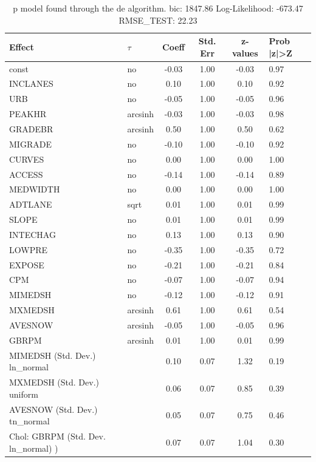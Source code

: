 \begin{table}
	\caption{p model found through the de algorithm. bic: 1847.86 Log-Likelihood: -673.47 RMSE_TEST: 22.23}
	\begin{center}
		\begin{tabular}{|l|l|c|c|c|l|}
			\hline
			Effect & $\tau$ & Coeff & Std. Err & z-values & Prob |z|>Z \\
			\hline
			const & no & -0.03 & 1.00 & -0.03 & 0.97 \\
			\hline
			INCLANES & no & 0.10 & 1.00 & 0.10 & 0.92 \\
			\hline
			URB & no & -0.05 & 1.00 & -0.05 & 0.96 \\
			\hline
			PEAKHR & arcsinh & -0.03 & 1.00 & -0.03 & 0.98 \\
			\hline
			GRADEBR & arcsinh & 0.50 & 1.00 & 0.50 & 0.62 \\
			\hline
			MIGRADE & no & -0.10 & 1.00 & -0.10 & 0.92 \\
			\hline
			CURVES & no & 0.00 & 1.00 & 0.00 & 1.00 \\
			\hline
			ACCESS & no & -0.14 & 1.00 & -0.14 & 0.89 \\
			\hline
			MEDWIDTH & no & 0.00 & 1.00 & 0.00 & 1.00 \\
			\hline
			ADTLANE & sqrt & 0.01 & 1.00 & 0.01 & 0.99 \\
			\hline
			SLOPE & no & 0.01 & 1.00 & 0.01 & 0.99 \\
			\hline
			INTECHAG & no & 0.13 & 1.00 & 0.13 & 0.90 \\
			\hline
			LOWPRE & no & -0.35 & 1.00 & -0.35 & 0.72 \\
			\hline
			EXPOSE & no & -0.21 & 1.00 & -0.21 & 0.84 \\
			\hline
			CPM & no & -0.07 & 1.00 & -0.07 & 0.94 \\
			\hline
			MIMEDSH & no & -0.12 & 1.00 & -0.12 & 0.91 \\
			\hline
			MXMEDSH & arcsinh & 0.61 & 1.00 & 0.61 & 0.54 \\
			\hline
			AVESNOW & arcsinh & -0.05 & 1.00 & -0.05 & 0.96 \\
			\hline
			GBRPM & arcsinh & 0.01 & 1.00 & 0.01 & 0.99 \\
			\hline
			MIMEDSH (Std. Dev.) ln_normal &  & 0.10 & 0.07 & 1.32 & 0.19 \\
			\hline
			MXMEDSH (Std. Dev.) uniform &  & 0.06 & 0.07 & 0.85 & 0.39 \\
			\hline
			AVESNOW (Std. Dev.) tn_normal &  & 0.05 & 0.07 & 0.75 & 0.46 \\
			\hline
			 Chol: GBRPM (Std. Dev. ln_normal) ) &  & 0.07 & 0.07 & 1.04 & 0.30 \\
			\hline
		\end{tabular}
	\end{center}
\end{table}